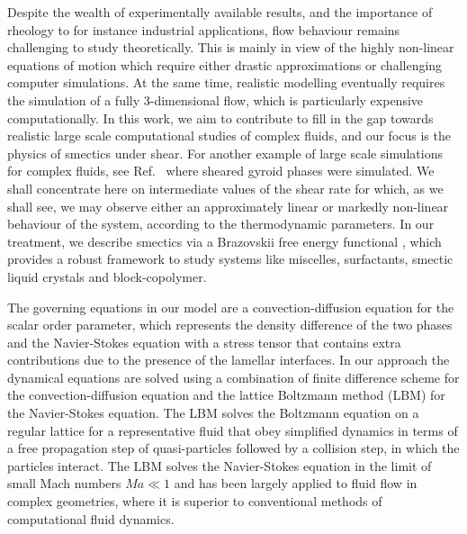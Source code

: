 \documentclass[8.5pt,twoside,twocolumn]{article}
\begin{document}
Despite the wealth of experimentally available results, and the importance of rheology to for instance industrial applications, flow behaviour remains challenging to study theoretically. This is mainly in view of the highly non-linear equations of motion which require either drastic approximations or challenging computer simulations. At the same time, realistic modelling eventually requires the simulation of a fully 3-dimensional flow, which is particularly expensive computationally. In this work, we aim to contribute to fill in the gap towards realistic large scale computational studies of complex fluids, and our focus is the physics of smectics under shear. For another example of large scale simulations for complex fluids, see Ref.~\cite{Saksena09} where sheared gyroid phases were simulated.
We shall concentrate here on intermediate values of the shear rate for which, as we shall see, we may observe either an approximately linear or markedly non-linear behaviour of the system, according to the thermodynamic parameters. In our treatment, we describe smectics via a Brazovskii free energy functional \cite{Brazovskii75}, which provides a robust framework to study systems like miscelles, surfactants, smectic liquid crystals and block-copolymer.


The governing equations in our model are a convection-diffusion equation for the scalar order parameter, which represents the density difference of the two phases and the Navier-Stokes equation with a stress tensor that contains extra contributions due to the presence of the lamellar interfaces.
In our approach the dynamical equations are solved using a combination of finite difference scheme for the convection-diffusion equation and the lattice Boltzmann method (LBM) \cite{Succi} for the Navier-Stokes equation.
The LBM solves the Boltzmann equation on a regular lattice for a representative fluid that obey simplified dynamics in terms of a free propagation step of quasi-particles followed by a collision step, in which the particles interact.
The LBM solves the Navier-Stokes equation in the limit of small Mach numbers $Ma\ll1$ and has been largely applied to fluid flow in complex geometries, where it is superior to conventional methods of computational fluid dynamics.
\end{document}
